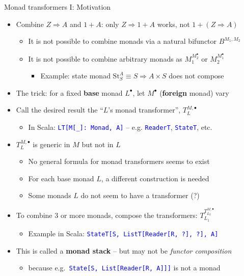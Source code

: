 \documentclass[english]{beamer}
\begin{document}
\begin{frame}{Monad transformers I: Motivation}

\begin{itemize}
\item {\footnotesize{}\vspace{-0.2cm}}Combine $Z\Rightarrow A$ and $1+A$:
only $Z\Rightarrow1+A$ works, not $1+\left(Z\Rightarrow A\right)$
\begin{itemize}
\item It is not possible to combine monads via a natural bifunctor $B^{M_{1},M_{2}}$
\item It is not possible to combine arbitrary monads as $M_{1}^{M_{2}^{\bullet}}$
or $M_{2}^{M_{1}^{\bullet}}$
\begin{itemize}
\item Example: state monad $\text{St}_{S}^{A}\equiv S\Rightarrow A\times S$
does not compose
\end{itemize}
\end{itemize}
\item The trick: for a fixed \textbf{base }monad $L^{\bullet}$, let $M^{\bullet}$
(\textbf{foreign }monad) vary
\item Call the desired result the ``$L$'s monad transformer'', $T_{L}^{M,\bullet}$
\begin{itemize}
\item In Scala: \texttt{\textcolor{blue}{\footnotesize{}LT{[}M{[}\_{]}:~Monad,
A{]}}} -- e.g. \texttt{\textcolor{blue}{\footnotesize{}ReaderT}},
\texttt{\textcolor{blue}{\footnotesize{}StateT}}, etc.
\end{itemize}
\item $T_{L}^{M,\bullet}$ is generic in $M$ but not in $L$
\begin{itemize}
\item No general formula for monad transformers seems to exist
\item For each base monad $L$, a different construction is needed
\item Some monads $L$ do not seem to have a transformer (?)
\end{itemize}
\item To combine 3 or more monads, compose the transformers: $T_{L_{1}}^{T_{L_{2}}^{M,\bullet}}$
\begin{itemize}
\item Example in Scala: \texttt{\textcolor{blue}{\footnotesize{}StateT{[}S,
ListT{[}Reader{[}R, ?{]}, ?{]}, A{]}}} 
\end{itemize}
\item This is called a \textbf{monad stack} -- but may not be \emph{functor
composition}
\begin{itemize}
\item because e.g.~\texttt{\textcolor{blue}{\footnotesize{}State{[}S, List{[}Reader{[}R,
A{]}{]}{]}}} is not a monad
\end{itemize}
\end{itemize}
\end{frame}
\end{document}
